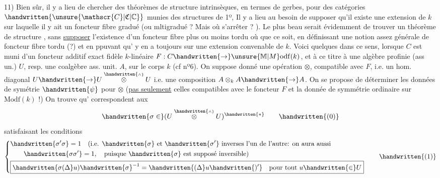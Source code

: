 11) Bien sûr, il y a lieu de chercher des théorèmes de structure intrinsèques, en termes de gerbes, pour des catégories $\handwritten{\unsure{\mathscr{C}|\mathfrak{C}|\mathbb{C}}}$ munies des structures de 1º, Il y a lieu au besoin de supposer qu'il existe une extension de $k$ sur laquelle il y ait un foncteur fibre  gradué (ou mltigradué ? Mais où s'arrêter ? ). Le plus beau serait évidemment de trouver un théorème de structure , sans \uline{supposer} l'existence d'un foncteur fibre plus ou moins tordu où que ce soit, en définissant une notion assez générale de foncteur fibre tordu (?) et en ppuvant qu' y en a toujours sur une extension convenable de $k$.
Voici quelques  dans ce sens, lorsque $C$ est muni d'un foncteur additif exact fidèle $k$-linéaire $F:C\handwritten{\to}\unsure{\mathbb{M}|M}\mathrm{odf}(k)$, et  à ce titre à une algèbre profinie (ass un.) $U$, resp. une coalgèbre ass. unit. $A$, sur le corps $k$ (cf nº6). On  suppose donné une opération $\otimes$, compatible avec $F$, i.e. un hom. diagonal $U\handwritten{\to}U\overset{\handwritten{\scriptscriptstyle\wedge}}{\otimes}U$ i.e. une composition $A\otimes_kA\handwritten{\to}A$. On se propose de déterminer les données de symétrie $\handwritten{\psi}$ pour $\otimes$ (\uline{pas seulement} celles compatibles avec le foncteur $F$ et la donnée de symmétrie ordinaire sur $\mathrm{Modf}(k)$ !) On trouve qu' correspondent aux
\margin{\handwritten{[Dans le cas du nº 6, \uline{\unsure{gr. deux|gr. deu.}}, on aura $\sigma=\pi^+\otimes\pi^++\pi^+\otimes\pi^-+\pi^-\otimes\pi^+-\pi^-\otimes\pi^-$]}}
\[
\handwritten{\sigma\in}(U\overset{\handwritten{\scriptscriptstyle\wedge}}{\otimes}U)^{\handwritten{*}}
\tag*{\handwritten{(0)}}
\]
satisfaisant les conditions
\[
\left\{\begin{aligned}
&\handwritten{\sigma'\sigma}=1\quad\text{(i.e. }\handwritten{\sigma}\text{ et }\handwritten{\sigma'}\text{ inverses l'un de l'autre: on aura aussi}\\
&\qquad\handwritten{\sigma\sigma'}=1,\quad\text{puisque }\handwritten{\sigma}\text{ est supposé inversible)}\\
&\boxed{\handwritten{\sigma(\Delta}u)\handwritten{\sigma}^{-1}=\handwritten{(\Delta}u\handwritten{)'}\quad\text{pour tout }u\handwritten{\in}U}
\end{aligned}\right.
\tag*{\handwritten{(1)}}
\]
